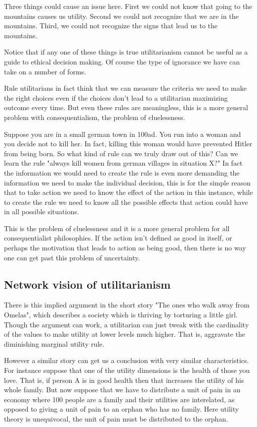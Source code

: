 Three things could cause an issue here. First we could not know that going to the mountains causes us utility. Second we could not recognize that we are in the mountains. Third, we could not recognize the signs that lead us to the mountains. 

Notice that if any one of these things is true utilitarianism cannot be useful as a guide to ethical decision making. Of course the type of ignorance we have can take on a number of forms. 

Rule utilitarians in fact think that we can measure the criteria we need to make the right choices even if the choices don't lead to a utilitarian maximizing outcome every time. But even these rules are meaningless, this is a more general problem with consequentialism, the problem of cluelessness.

Suppose you are in a small german town in 100ad. You run into a woman and you decide not to kill her. In fact, killing this woman would have prevented Hitler from being born. So what kind of rule can we truly draw out of this? Can we learn the rule "always kill women from german villages in situation X?" In fact the information we would need to create the rule is even more demanding the information we need to make the individual decision, this is for the simple reason that to take action we need to know the effect of the action in this instance, while to create the rule we need to know all the possible effects that action could have in all possible situations. 

This is the problem of cluelessness\cite{Lenman2000} and it is a more general problem for all consequentialist philosophies. If the action isn't defined as good in itself, or perhaps the motivation that leads to action as being good, then there is no way one can get past this problem of uncertainty. 


\subsection{Network vision of utilitarianism}

There is this implied argument in the short story "The ones who walk away from Omelas", which describes a society which is thriving by torturing a little girl. Though the argument can work, a utilitarian can just tweak with the cardinality of the values to make utility at lower levels much higher. That is, aggravate the diminishing marginal utility rule. 

However a similar story can get us a conclusion with very similar characteristics. For instance suppose that one of the utility dimensions is the health of those you love. That is, if person A is in good health then that increases the utility of his whole family. But now suppose that we have to distribute a unit of pain in an economy where 100 people are a family and their utilities are interelated, as opposed to giving a unit of pain to an orphan who has no family. Here utility theory is unequivocal, the unit of pain must be distributed to the orphan. 


